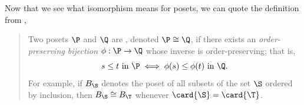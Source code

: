 Now that we see what isomorphism means for posets, we can quote the definition
from \citet*{Stanley:2011:ECV:2124415},

\begin{quotation}

Two posets $\P$ and $\Q$ are , denoted $\P \cong \Q$, if
there exists an \emph{order-preserving bijection} $\phi : \P \to \Q$ whose
inverse is order-preserving; that is, $$s \leq t~\text{in}~\P \iff \phi(s) \leq
\phi(t)~\text{in}~\Q.$$ For example, if $B_{\S}$ denotes the poset of all subsets
of the set $\S$ ordered by inclusion, then $B_{\S} \cong B_{\T}$ whenever $\card{\S} =
\card{\T}$.

\end{quotation}
